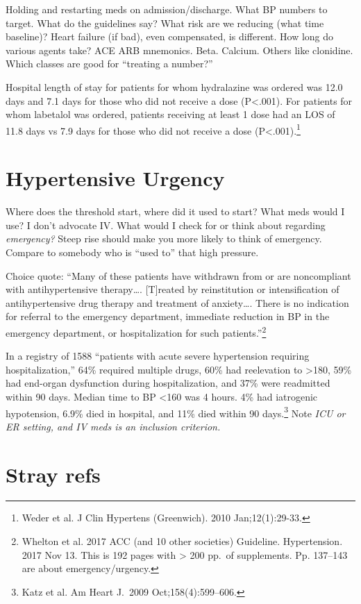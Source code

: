 \documentclass{tufte-handout}
\begin{document}
Holding and restarting meds on admission/discharge. What BP numbers to
target. What do the guidelines say? What risk are we reducing (what
time baseline)? Heart failure (if bad), even compensated, is
different. How long do various agents take? ACE ARB mnemonics. Beta.
Calcium. Others like clonidine. Which classes are good for ``treating
a number?''

Hospital length of stay for patients for whom hydralazine was ordered
was 12.0 days and 7.1 days for those who did not receive a dose
(P<.001). For patients for whom labetalol was ordered, patients
receiving at least 1 dose had an LOS of 11.8 days vs 7.9 days for
those who did not receive a dose (P<.001).\footnote{Weder et al. J
  Clin Hypertens (Greenwich). 2010 Jan;12(1):29-33. }
 

\section{Hypertensive Urgency}

Where does the threshold start, where did it used to start? What meds
would I use? I don't advocate IV. What would I check for or think
about regarding \emph{emergency?} Steep rise should make you more
likely to think of emergency. Compare to somebody who is ``used to''
that high pressure.

Choice quote: ``Many of these patients have withdrawn from or are
noncompliant with antihypertensive therapy\ldots{}. [T]reated by
reinstitution or intensification of antihypertensive drug therapy and
treatment of anxiety\ldots{}. There is no indication for referral to
the emergency department, immediate reduction in BP in the emergency
department, or hospitalization for such patients.''\footnote{Whelton
  et al. 2017 ACC (and 10 other societies) Guideline. Hypertension.
  2017 Nov 13. This is 192 pages with > 200 pp.\ of supplements. Pp.
  137--143 are about emergency/urgency.}

In a registry of 1588 ``patients with acute severe hypertension
requiring hospitalization,'' 64\% required multiple drugs, 60\% had
reelevation to >180, 59\% had end-organ dysfunction during
hospitalization, and 37\% were readmitted within 90 days. Median time
to BP <160 was 4 hours. 4\% had iatrogenic hypotension, 6.9\% died in
hospital, and 11\% died within 90 days.\footnote{Katz et al. Am Heart
  J.\ 2009 Oct;158(4):599--606.} Note \emph{ICU or ER setting, and IV
  meds is an inclusion criterion.}


\section{Stray refs}
\end{document}

